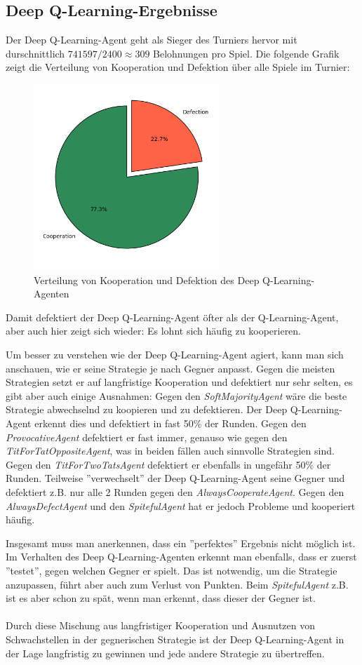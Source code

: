 \subsection{Deep Q-Learning-Ergebnisse}
Der Deep Q-Learning-Agent geht als Sieger des Turniers hervor mit durschnittlich $741597 / 2400 \approx 309$ Belohnungen pro Spiel. 
Die folgende Grafik zeigt die Verteilung von Kooperation und Defektion über alle Spiele im Turnier:
\begin{figure}[H]
    \centering
    \includegraphics[width=7cm]{../poster/logos/deepqPie.png}
    \caption{Verteilung von Kooperation und Defektion des Deep Q-Learning-Agenten}
    \label{fig:deepqverteilung}
\end{figure}
Damit defektiert der Deep Q-Learning-Agent öfter als der Q-Learning-Agent, aber auch hier zeigt sich wieder: Es lohnt sich 
häufig zu kooperieren. 

Um besser zu verstehen wie der Deep Q-Learning-Agent agiert, kann man sich anschauen, wie er seine Strategie
je nach Gegner anpasst. Gegen die meisten Strategien setzt er auf langfristige Kooperation und defektiert nur sehr selten, es gibt
aber auch einige Ausnahmen:
Gegen den \textit{SoftMajorityAgent} wäre die beste Strategie abwechselnd zu koopieren und zu defektieren. Der
Deep Q-Learning-Agent erkennt dies und defektiert in fast 50\% der Runden. Gegen den \textit{ProvocativeAgent} defektiert er
fast immer, genauso wie gegen den \textit{TitForTatOppositeAgent}, was in beiden fällen auch sinnvolle Strategien sind. Gegen den 
\textit{TitForTwoTatsAgent} defektiert er ebenfalls in ungefähr 50\% der Runden. Teilweise ''verwechselt'' der Deep Q-Learning-Agent
seine Gegner und defektiert z.B. nur alle 2 Runden gegen den \textit{AlwaysCooperateAgent}. Gegen den \textit{AlwaysDefectAgent}
und den \textit{SpitefulAgent} hat er jedoch Probleme und kooperiert häufig. 

Insgesamt muss man anerkennen, dass ein ''perfektes'' Ergebnis nicht möglich ist. Im Verhalten des Deep Q-Learning-Agenten erkennt man ebenfalls,
dass er zuerst ''testet'', gegen welchen Gegner er spielt. Das ist notwendig, um die Strategie anzupassen, führt aber auch zum Verlust von Punkten.
Beim \textit{SpitefulAgent} z.B. ist es aber schon zu spät, wenn man erkennt, dass dieser der Gegner ist. \\ \\
Durch diese Mischung aus langfristiger Kooperation und Ausnutzen von Schwachstellen in der gegnerischen Strategie ist der 
Deep Q-Learning-Agent in der Lage langfristig zu gewinnen und jede andere Strategie zu übertreffen.